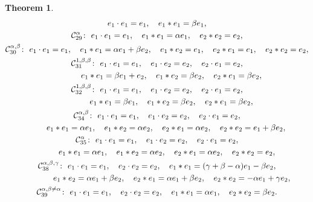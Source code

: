 \documentclass[10pt,a4paper]{amsart}
\numberwithin{equation}{section}
\newtheorem{Theorem}{Theorem}[section]
\begin{document}
\begin{Theorem}
\begin{gather*}
 e_{1}\cdot e_{1}=e_{1}, \quad
 e_{1}\ast e_{1}=\beta e_{1},
\\
 \mathcal{C}_{29}^{\alpha }\colon\
 e_{1}\cdot e_{1}=e_{1}, \quad
 e_{1}\ast e_{1}=\alpha e_{1}, \quad e_{2}\ast e_{2}=e_{2},
\\
 \mathcal{C}_{30}^{\alpha ,\beta }\colon\
 e_{1}\cdot e_{1}=e_{1}, \quad
 e_{1}\ast e_{1}=\alpha e_{1}+\beta e_{2}, \quad e_{1}\ast e_{2}=e_{1}, \quad
e_{2}\ast e_{1}=e_{1}, \quad
 e_{2}\ast e_{2}=e_{2},
\\
 \mathcal{C}_{31}^{1 ,\beta ,\beta } \colon\
 e_{1}\cdot e_{1}=e_{1}, \quad e_{1}\cdot e_{2}= e_{2}, \quad e_{2}\cdot
e_{1}=e_{2}, \\
\hphantom{\mathcal{C}_{31}^{1 ,\beta ,\beta } \colon} \ e_{1}\ast e_{1}=\beta e_{1}+e_{2}, \quad e_{1}\ast e_{2}=\beta e_{2}, \quad
e_{2}\ast e_{1}=\beta e_{2},
\\
 \mathcal{C}_{32}^{1 ,\beta ,\beta }\colon\
 e_{1}\cdot e_{1}=e_{1}, \quad e_{1}\cdot e_{2}= e_{2}, \quad e_{2}\cdot
e_{1}=e_{2}, \\
\hphantom{\mathcal{C}_{32}^{1 ,\beta ,\beta }\colon} \ e_{1}\ast e_{1}=\beta e_{1}, \quad e_{1}\ast e_{2}=\beta e_{2}, \quad
e_{2}\ast e_{1}=\beta e_{2},
 \\
 \mathcal{C}_{34}^{\alpha ,\beta }\colon\
 e_{1}\cdot e_{1}=e_{1}, \quad e_{1}\cdot e_{2}=e_{2}, \quad e_{2}\cdot
e_{1}=e_{2}, \\
\hphantom{\mathcal{C}_{34}^{\alpha ,\beta }} \ e_{1}\ast e_{1}=\alpha e_{1}, \quad e_{1}\ast e_{2}=\alpha e_{2}, \quad
e_{2}\ast e_{1}=\alpha e_{2}, \quad e_{2}\ast e_{2}=e_{1}+\beta e_{2},
\\
 \mathcal{C}_{35}^{\alpha }\colon\
 e_{1}\cdot e_{1}=e_{1}, \quad e_{1}\cdot e_{2}=e_{2}, \quad e_{2}\cdot
e_{1}=e_{2}, \\
\hphantom{\mathcal{C}_{35}^{\alpha }\colon} \ e_{1}\ast e_{1}=\alpha e_{1}, \quad e_{1}\ast e_{2}=\alpha e_{2}, \quad
e_{2}\ast e_{1}=\alpha e_{2}, \quad e_{2}\ast e_{2}=e_{2},
 \\
 \mathcal{C}_{38}^{\alpha ,\beta ,\gamma }\colon\
 e_{1}\cdot e_{1}=e_{1}, \quad e_{2}\cdot e_{2}=e_{2}, \quad
 e_{1}\ast e_{1}=( \gamma +\beta -\alpha ) e_{1}-\beta e_{2},\\
\hphantom{\mathcal{C}_{38}^{\alpha ,\beta ,\gamma }\colon} \ e_{1}\ast e_{2}=\alpha e_{1}+\beta e_{2}, \quad
 e_{2}\ast e_{1}=\alpha
e_{1}+\beta e_{2}, \quad e_{2}\ast e_{2}=-\alpha e_{1}+\gamma e_{2},
\\
 \mathcal{C}_{39}^{\alpha ,\beta \neq \alpha }\colon\
 e_{1}\cdot e_{1}=e_{1}, \quad e_{2}\cdot e_{2}=e_{2}, \quad
 e_{1}\ast e_{1}=\alpha e_{1}, \quad e_{2}\ast e_{2}=\beta e_{2}.
 \end{gather*}


\end{Theorem}
\end{document}
